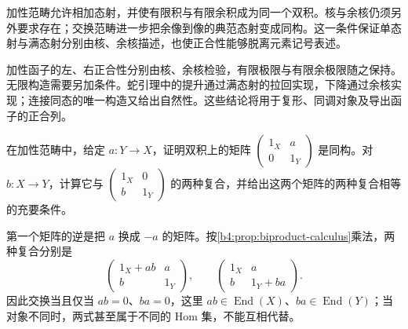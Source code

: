 




\begin{chaptersummary}
	加性范畴允许相加态射，并使有限积与有限余积成为同一个双积。核与余核仍须另外要求存在；交换范畴进一步把余像到像的典范态射变成同构。这一条件保证单态射与满态射分别由核、余核描述，也使正合性能够脱离元素记号表述。

	\ProseParagraphBreak
	加性函子的左、右正合性分别由核、余核检验，有限极限与有限余极限随之保持。无限构造需要另加条件。蛇引理中的提升通过满态射的拉回实现，下降通过余核实现；连接同态的唯一构造又给出自然性。这些结论将用于复形、同调对象及导出函子的正合列。
\end{chaptersummary}

\BookExercises

\begin{exercise}\label{b4:ex:04-triangular-matrix}
	在加性范畴中，给定 \(a:Y\to X\)，证明双积上的矩阵 \(\begin{pmatrix}1_X&a\\0&1_Y\end{pmatrix}\) 是同构。对 \(b:X\to Y\)，计算它与 \(\begin{pmatrix}1_X&0\\b&1_Y\end{pmatrix}\) 的两种复合，并给出这两个矩阵的两种复合相等的充要条件。
\end{exercise}
\begin{solution}
	第一个矩阵的逆是把 \(a\) 换成 \(-a\) 的矩阵。按\cref{b4:prop:biproduct-calculus}乘法，两种复合分别是
	\[
		\begin{pmatrix}1_X+ab&a\\b&1_Y\end{pmatrix},\qquad
		\begin{pmatrix}1_X&a\\b&1_Y+ba\end{pmatrix}.
	\]
	因此交换当且仅当 \(ab=0\)、\(ba=0\)，这里 \(ab\in\operatorname{End}(X)\)、\(ba\in\operatorname{End}(Y)\)；当对象不同时，两式甚至属于不同的 Hom 集，不能互相代替。
\end{solution}

